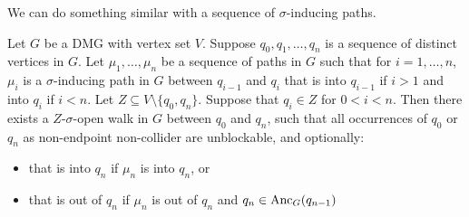 We can do something similar with a sequence of $\sigma$-inducing paths.
\begin{Lem}\label{lem:dpag_concatenating_sigma-inducing_paths_into_open_walk}
  Let $G$ be a DMG with vertex set $V$. 
  Suppose $q_0, q_1, \dots, q_n$ is a sequence of distinct vertices in $G$.
  Let $\mu_1,\dots,\mu_n$ be a sequence of paths in $G$ such that for $i=1,\dots,n$, $\mu_i$ is a $\sigma$-inducing path in $G$ between $q_{i-1}$ and $q_i$ that is into $q_{i-1}$ if $i > 1$ and into $q_i$ if $i < n$.
  Let $Z \subseteq V \setminus \{q_0,q_n\}$.
  Suppose that $q_i \in Z$ for $0 < i < n$.
  Then there exists a $Z$-$\sigma$-open walk in $G$ between $q_0$ and $q_n$, such that all occurrences of $q_0$ or $q_n$ as non-endpoint non-collider are unblockable, and optionally:
  \begin{itemize}
    \item that is into $q_n$ if $\mu_n$ is into $q_n$, or
    \item that is out of $q_n$ if $\mu_n$ is out of $q_n$ and $q_n \in \mathrm{Anc}_G(q_{n-1})$
  \end{itemize}
\end{Lem}
